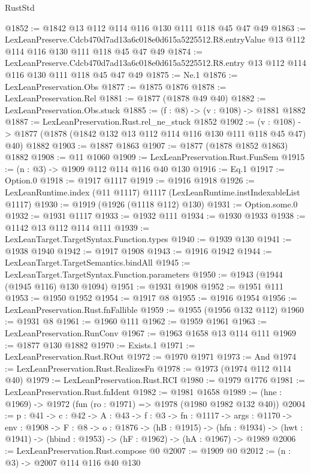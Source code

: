 \begin{lexlean}{RustStd}
\begin{coremodule}
@1852 := @1842 @13 @112 @114 @116 @130 @111 @118 @45 @47 @49
@1863 := LexLeanPreserve.Cdcb470d7ad13a6c018e0d615a5225512.R8.entryValue
    @13
    @112
    @114
    @116
    @130
    @111
    @118
    @45
    @47
    @49
@1874 := LexLeanPreserve.Cdcb470d7ad13a6c018e0d615a5225512.R8.entry
    @13
    @112
    @114
    @116
    @130
    @111
    @118
    @45
    @47
    @49
@1875 := Ne.{1}
@1876 := LexLeanPreservation.Obs
@1877 := @1875 @1876
@1878 := LexLeanPreservation.Rel
@1881 := @1877 (@1878 @49 @40)
@1882 := LexLeanPreservation.Obs.stuck
@1885 := (f : @8) -> (v : @108) -> @1881 @1882
@1887 := LexLeanPreservation.Rust.rel_ne_stuck @1852
@1902 := (v : @108) ->
  @1877 (@1878 (@1842 @132 @13 @112 @114 @116 @130 @111 @118 @45 @47) @40) @1882
@1903 := @1887 @1863
@1907 := @1877 (@1878 @1852 @1863) @1882
@1908 := @11 @1060
@1909 := LexLeanPreservation.Rust.FunSem
@1915 := (n : @3) -> @1909 @112 @114 @116 @40 @130
@1916 := Eq.{1}
@1917 := Option.{0}
@1918 := @1917 @1117
@1919 := @1916 @1918
@1926 := LexLeanRuntime.index (@11 @1117) @1117 (LexLeanRuntime.instIndexableList @1117)
@1930 := @1919 (@1926 (@1118 @112) @130)
@1931 := Option.some.{0}
@1932 := @1931 @1117
@1933 := @1932 @111
@1934 := @1930 @1933
@1938 := @1142 @13 @112 @114 @111
@1939 := LexLeanTarget.TargetSyntax.Function.types
@1940 := @1939 @130
@1941 := @1938 @1940
@1942 := @1917 @1908
@1943 := @1916 @1942
@1944 := LexLeanTarget.TargetSemantics.bindAll
@1945 := LexLeanTarget.TargetSyntax.Function.parameters
@1950 := @1943 (@1944 (@1945 @116) @130 @1094)
@1951 := @1931 @1908
@1952 := @1951 @111
@1953 := @1950 @1952
@1954 := @1917 @8
@1955 := @1916 @1954
@1956 := LexLeanPreservation.Rust.fnFallible
@1959 := @1955 (@1956 @132 @112)
@1960 := @1931 @8
@1961 := @1960 @111
@1962 := @1959 @1961
@1963 := LexLeanPreservation.RunConv
@1967 := @1963 @1658 @13 @114 @111
@1969 := @1877 @130 @1882
@1970 := Exists.{1}
@1971 := LexLeanPreservation.Rust.ROut
@1972 := @1970 @1971
@1973 := And
@1974 := LexLeanPreservation.Rust.RealizesFn
@1978 := @1973 (@1974 @112 @114 @40)
@1979 := LexLeanPreservation.Rust.RCI
@1980 := @1979 @1776
@1981 := LexLeanPreservation.Rust.fnIdent
@1982 := @1981 @1658
@1989 := (hne : @1969) -> @1972 (fun (ro : @1971) => @1978 (@1980 @1982 @132 @40))
@2004 := {p : @41} ->
  {c : @42} ->
  {A : @43} ->
  {f : @3} ->
  {fn : @1117} ->
  {args : @1170} ->
  {env : @1908} ->
  {F : @8} ->
  {o : @1876} ->
  (hB : @1915) ->
  (hfn : @1934) -> (hwt : @1941) -> (hbind : @1953) -> (hF : @1962) -> (hA : @1967) -> @1989
@2006 := LexLeanPreservation.Rust.compose @0
@2007 := @1909 @0
@2012 := (n : @3) -> @2007 @114 @116 @40 @130

\end{coremodule}
\end{lexlean}
